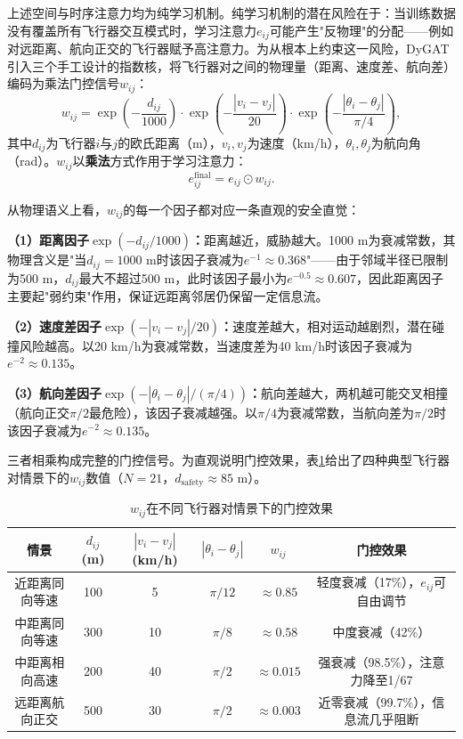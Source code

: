 \documentclass[12pt,a4paper,UTF8]{ctexbook}
\begin{document}
上述空间与时序注意力均为纯学习机制。纯学习机制的潜在风险在于：当训练数据没有覆盖所有飞行器交互模式时，学习注意力$e_{ij}$可能产生"反物理"的分配——例如对远距离、航向正交的飞行器赋予高注意力。为从根本上约束这一风险，DyGAT引入三个手工设计的指数核，将飞行器对之间的物理量（距离、速度差、航向差）编码为乘法门控信号$w_{ij}$：
\begin{equation}
    w_{ij} = \exp\!\left(-\frac{d_{ij}}{1000}\right) \cdot \exp\!\left(-\frac{|v_i - v_j|}{20}\right) \cdot \exp\!\left(-\frac{|\theta_i - \theta_j|}{\pi/4}\right),
    \label{eq:gating_w}
\end{equation}
其中$d_{ij}$为飞行器$i$与$j$的欧氏距离（m），$v_i,v_j$为速度（km/h），$\theta_i,\theta_j$为航向角（rad）。$w_{ij}$以\textbf{乘法}方式作用于学习注意力：
\begin{equation}
    e_{ij}^{\text{final}} = e_{ij} \odot w_{ij}.
    \label{eq:gating_final}
\end{equation}

从物理语义上看，$w_{ij}$的每一个因子都对应一条直观的安全直觉：

\textbf{（1）距离因子$\exp(-d_{ij}/1000)$：}距离越近，威胁越大。1000 m为衰减常数，其物理含义是"当$d_{ij}=1000$ m时该因子衰减为$e^{-1}\approx0.368$"——由于邻域半径已限制为500 m，$d_{ij}$最大不超过500 m，此时该因子最小为$e^{-0.5}\approx0.607$，因此距离因子主要起"弱约束"作用，保证远距离邻居仍保留一定信息流。

\textbf{（2）速度差因子$\exp(-|v_i-v_j|/20)$：}速度差越大，相对运动越剧烈，潜在碰撞风险越高。以20 km/h为衰减常数，当速度差为40 km/h时该因子衰减为$e^{-2}\approx0.135$。

\textbf{（3）航向差因子$\exp(-|\theta_i-\theta_j|/(\pi/4))$：}航向差越大，两机越可能交叉相撞（航向正交$\pi/2$最危险），该因子衰减越强。以$\pi/4$为衰减常数，当航向差为$\pi/2$时该因子衰减为$e^{-2}\approx0.135$。

三者相乘构成完整的门控信号。为直观说明门控效果，表\ref{tab:gating}给出了四种典型飞行器对情景下的$w_{ij}$数值（$N=21$，$d_{\text{safety}}\approx85$ m）。

\begin{table}[H]
    \centering\small
    \caption{$w_{ij}$在不同飞行器对情景下的门控效果}
    \label{tab:gating}
    \begin{tabular}{|c|c|c|c|c|c|}
        \hline
        \textbf{情景} & $d_{ij}$(m) & $|v_i-v_j|$(km/h) & $|\theta_i-\theta_j|$ & $w_{ij}$ & \textbf{门控效果} \\
        \hline
        近距离同向等速 & 100 & 5 & $\pi/12$ & $\approx0.85$ & 轻度衰减（17\%），$e_{ij}$可自由调节 \\
        中距离同向等速 & 300 & 10 & $\pi/8$ & $\approx0.58$ & 中度衰减（42\%） \\
        中距离相向高速 & 200 & 40 & $\pi/2$ & $\approx0.015$ & 强衰减（98.5\%），注意力降至1/67 \\
        远距离航向正交 & 500 & 30 & $\pi/2$ & $\approx0.003$ & 近零衰减（99.7\%），信息流几乎阻断 \\
        \hline
    \end{tabular}
\end{table}
\end{document}
